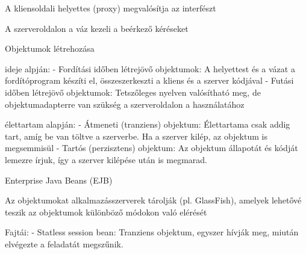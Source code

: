 \documentclass[twoside, a4paper, 12pt]{article}
\begin{document}
\begin{description}
                                                                    \item A kliensoldali helyettes (proxy) megvalósítja az interfészt
                                                                    \item A szerveroldalon a váz kezeli a beérkező kéréseket
                                                                    \item  Objektumok létrehozása
                                                                    \item ideje alpján:
                                                                        - Fordítási időben létrejövő objektumok: A helyettest és a vázat a fordítóprogram készíti el,
                                                                        összeszerkeszti a kliens és a szerver kódjával
                                                                        - Futási időben létrejövő objektumok: Tetszőleges nyelven valósítható meg, de objektumadapterre van
                                                                        szükség a szerveroldalon a használatához
                                                                    \item élettartam alapján:
                                                                        - Átmeneti (tranziens) objektum: Élettartama csak addig tart, amíg be van töltve a szerverbe. 
                                                                        Ha a szerver kilép, az objektum is megsemmisül
                                                                        - Tartós (perzisztens) objektum: Az objektum állapotát és kódját lemezre írjuk, így a szerver kilépése után
                                                                        is megmarad.
                                                                    \item  Enterprise Java Beans (EJB)
                                                                    \item Az objektumokat alkalmazásszerverek tárolják (pl. GlassFish), amelyek lehetővé teszik az objektumok
                                                                        különböző módokon való elérését
                                                                    \item Fajtái:
                                                                        - Statless session bean: Tranziens objektum, egyszer hívják meg, miután elvégezte a feladatát megszűnik.

\end{description}
\end{document}
